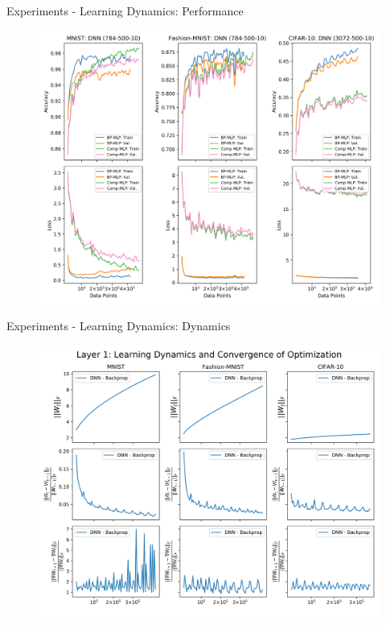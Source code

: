 \documentclass[dvipsnames, usenames]{beamer}
\begin{document}
\begin{frame}{Experiments - Learning Dynamics: Performance}
	\begin{figure}
		\centering
		\includegraphics[width=\textwidth]{../figures/learning}
	\end{figure}
\end{frame}


\begin{frame}{Experiments - Learning Dynamics: Dynamics}
	\begin{figure}
		\centering
		\includegraphics[width=\textwidth]{../figures/dynamics_l1}
	\end{figure}
\end{frame}
\end{document}
